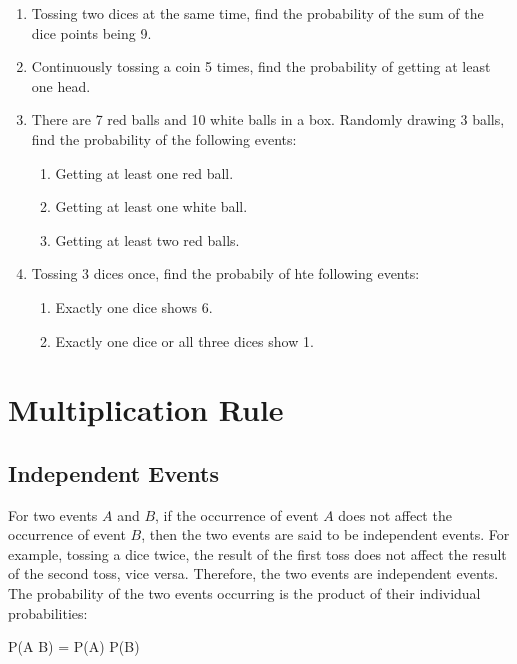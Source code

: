 \documentclass{report}
\begin{document}
\begin{multicols}{2}
\begin{enumerate}
    \item Tossing two dices at the same time, find the probability of the sum of the dice
          points being 9.

    \item Continuously tossing a coin 5 times, find the probability of getting at least
          one head.

    \item There are 7 red balls and 10 white balls in a box. Randomly drawing 3 balls,
          find the probability of the following events:

          \begin{enumerate}
            \item Getting at least one red ball.
            \item Getting at least one white ball.
            \item Getting at least two red balls.
          \end{enumerate}

    \item Tossing 3 dices once, find the probabily of hte following events:
          \begin{enumerate}
            \item Exactly one dice shows 6.
            \item Exactly one dice or all three dices show 1.
          \end{enumerate}
  \end{enumerate}

  \section{Multiplication Rule}

  \subsection*{Independent Events}

  For two events $A$ and $B$, if the occurrence of event $A$ does not affect the
  occurrence of event $B$, then the two events are said to be independent events.
  For example, tossing a dice twice, the result of the first toss does not affect
  the result of the second toss, vice versa. Therefore, the two events are
  independent events. The probability of the two events occurring is the product
  of their individual probabilities:
  \begin{cequation}
    P(A \cap B) = P(A) \times P(B)
  \end{cequation}


\end{multicols}
\end{document}
